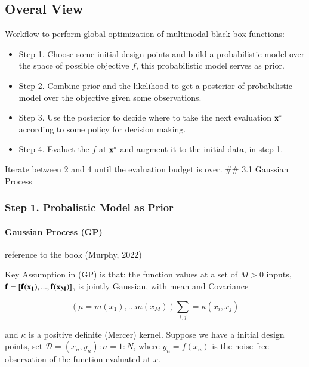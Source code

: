 \documentclass[]{elsarticle} %
\begin{document}
\hypertarget{overal-view}{%
\subsection{Overal View}\label{overal-view}}

Workflow to perform global optimization of multimodal black-box
functions:

\begin{itemize}
\item
  Step 1. Choose some initial design points and build a probabilistic
  model over the space of possible objective \(f\), this probabilistic
  model serves as prior.
\item
  Step 2. Combine prior and the likelihood to get a posterior of
  probabilistic model over the objective given some observations.
\item
  Step 3. Use the posterior to decide where to take the next
  evaluation \(\bf{x^*}\) according to some policy for decision making.
\item
  Step 4. Evaluet the \(f\) at \(\bf{x^*}\) and augment it to the initial
  data, in step 1.
\end{itemize}

Iterate between 2 and 4 until the evaluation budget is over. \#\# 3.1
Gaussian Process

\newpage

\hypertarget{step-1.-probalistic-model-as-prior}{%
\subsubsection{Step 1. Probalistic Model as Prior}\label{step-1.-probalistic-model-as-prior}}

\hypertarget{gaussian-process-gp}{%
\paragraph{Gaussian Process (GP)}\label{gaussian-process-gp}}

reference to the book (Murphy, 2022)

Key Assumption in (GP) is that: the function values at a set of \(M > 0\)
inputs, \(\bf{f} = [f(x_1), ...,f(x_M)]\), is jointly Gaussian, with mean
and Covariance

\begin{equation}
(\mu = m(x_1),...m(x_M))
\sum_{i,j}= \kappa(x_i,x_j)
\label{eq:mean_cov}
\end{equation}

and \(\kappa\) is a positive definite (Mercer) kernel. Suppose we have a
initial design points, set \(\mathcal{D} = {(x_n, y_n) : n = 1 : N}\),
where \(y_n = f(x_n)\) is the noise-free observation of the function
evaluated at \(x\).
\end{document}
